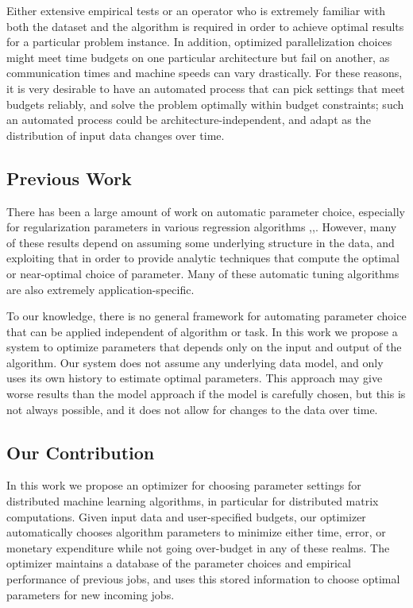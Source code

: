 Either extensive empirical tests or an operator who is extremely 
familiar with both the dataset and the algorithm is required in order 
to achieve optimal results for a particular problem instance. In addition,
optimized parallelization choices might meet time budgets on one particular
architecture but fail on another, as communication times and machine
speeds can vary drastically. For these reasons, it is very desirable 
to have an automated process that can pick settings that meet budgets
reliably, and solve the problem optimally within budget constraints; such
an automated process could be architecture-independent, and adapt 
as the distribution of input data changes over time. 

\subsection{Previous Work}
There has been a large amount of work on automatic parameter choice, 
especially for regularization parameters in various regression algorithms 
\cite{CI12},\cite{GEE10},\cite{BBGH07}. However, many of these results depend on assuming some 
underlying structure in the data, and exploiting that in order to provide 
analytic techniques that compute the optimal or near-optimal choice of 
parameter. Many of these automatic tuning algorithms are also extremely 
application-specific. 

To our knowledge, there is no general framework for automating parameter 
choice that can be applied independent of algorithm or task. In this work 
we propose a system to optimize parameters that depends only on the input 
and output of the algorithm. Our system does not assume any underlying 
data model, and only uses its own history to estimate optimal parameters. 
This approach may give worse results than the model approach if the model 
is carefully chosen, but this is not always possible, and it does not
allow for changes to the data over time.

\subsection{Our Contribution}
In this work we propose an optimizer for choosing parameter settings for 
distributed machine learning algorithms, in particular for distributed 
matrix computations. Given input data and user-specified budgets, our 
optimizer automatically chooses algorithm parameters to minimize either
time, error, or monetary expenditure while not going over-budget in any 
of these realms. The optimizer maintains a database of the parameter 
choices and empirical performance of previous jobs, and uses this stored 
information to choose optimal parameters for new incoming jobs.

